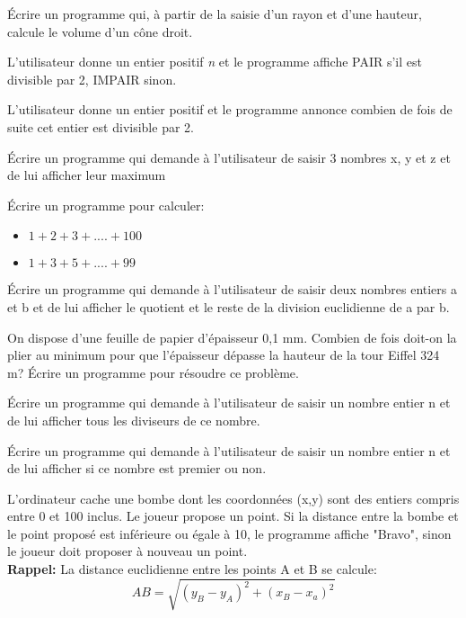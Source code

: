 \documentclass[a4paper,11pt]{article}
\begin{document}
\begin{exo}
Écrire un programme qui, à partir de la saisie d'un rayon et d'une hauteur, calcule le volume d'un cône droit.
\end{exo}
\begin{exo}
L'utilisateur donne un entier positif \emph{n} et le programme affiche PAIR s'il est divisible par 2, IMPAIR sinon.
\end{exo}
\begin{exo}
L'utilisateur donne un entier positif et le programme annonce combien de fois de suite cet entier est divisible par 2.
\end{exo}
\begin{exo}
Écrire un programme qui demande à l’utilisateur de saisir 3 nombres x, y et z et de lui afficher leur maximum
\end{exo}
\begin{exo}
Écrire un programme pour calculer:
\begin{itemize}
\item $1+2+3+....+100$
\item $1+3+5+....+99$
\end{itemize}
\end{exo}
\begin{exo}
Écrire un programme qui demande à l’utilisateur de saisir deux nombres entiers a et b et de lui afficher le quotient et le reste de la division euclidienne de a par b.
\end{exo}
\begin{exo}
On dispose d'une feuille de papier d'épaisseur 0,1 mm.
Combien de fois doit-on la plier au minimum pour que l'épaisseur dépasse la hauteur de la tour Eiffel 324 m?
Écrire un programme pour résoudre ce problème. 
\end{exo}
\begin{exo}
Écrire un programme qui demande à l’utilisateur de saisir un nombre entier n et de lui afficher tous les diviseurs de ce nombre.
\end{exo}
\begin{exo}
Écrire un programme qui demande à l’utilisateur de saisir un nombre entier n et de lui afficher si ce nombre est premier ou non.
\end{exo}
\begin{exo}
L'ordinateur cache une bombe dont les coordonnées (x,y) sont des entiers compris entre 0 et 100 inclus.
Le joueur propose un point. Si la distance entre la bombe et le point proposé est inférieure ou égale à 10, le programme affiche "Bravo", sinon le joueur doit proposer à nouveau un point.\\
\textbf{Rappel:} La distance euclidienne entre les points A et B se calcule:
$$AB = \sqrt{(y_B-y_A)^2+(x_B-x_a)^2}$$
\end{exo}
\end{document}
